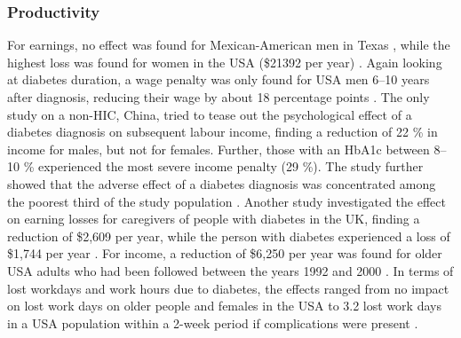 \subsubsection*{Productivity}
For earnings, no effect was found for Mexican-American men in Texas \parencite{Bastida2002}, while the highest loss was found for women in the USA (\$21392 per year) \parencite{Minor2011}. Again looking at diabetes duration, a wage penalty was only found for USA men 6--10 years after diagnosis, reducing their wage by about 18 percentage points \parencite{Minor2013}. The only study on a non-\ac{HIC}, China, tried to tease out the psychological effect of a diabetes diagnosis on subsequent labour income, finding a reduction of 22 \% in income for males, but not for females. Further, those with an \ac{HbA1c} between 8--10 \% experienced the most severe income penalty (29 \%). The study further showed that the adverse effect of a diabetes diagnosis was concentrated among the poorest third of the study population \parencite{Liu2014}. Another study investigated the effect on earning losses for caregivers of people with diabetes in the \ac{UK}, finding a reduction of \$2,609 per year, while the person with diabetes experienced a loss of \$1,744 per year \parencite{Holmes2003a}. For income, a reduction of \$6,250 per year was found for older USA adults who had been followed between the years 1992 and 2000 \parencite{Rivera2004}. In terms of lost workdays and work hours due to diabetes, the effects ranged from no impact on lost work days on older people \parencite{Rivera2004} and females in the USA \parencite{Minor2011} to 3.2 lost work days in a USA population within a 2-week period if complications were present \parencite{Ng2001b}.


